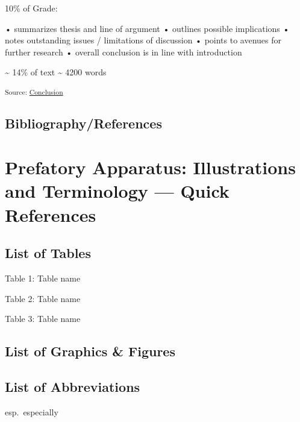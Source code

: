\documentclass[12pt,a4paper]{report}      %
\begin{document}
10\% of Grade:

• summarizes thesis and line of argument • outlines possible
implications • notes outstanding issues / limitations of discussion •
points to avenues for further research • overall conclusion is in line
with introduction

\textasciitilde{} 14\% of text \textasciitilde{} 4200 words

\textsubscript{Source:
\href{https://VJMeyer.github.io/submission/chapters/Conclusion.qmd.html\#cf16ed96-aa1a-4d5f-a93d-d5f1b524cf26}{Conclusion}}

\section*{Bibliography/References}\label{bibliographyreferences}

\label{refs}

\chapter*{Prefatory Apparatus: Illustrations and Terminology --- Quick
References}\label{prefatory-apparatus-illustrations-and-terminology-quick-references}

\section*{List of Tables}\label{list-of-tables}

Table 1: Table name

Table 2: Table name

Table 3: Table name

\section*{List of Graphics \& Figures}\label{list-of-graphics-figures}

\section*{List of Abbreviations}\label{list-of-abbreviations}

esp.~especially
\end{document}
